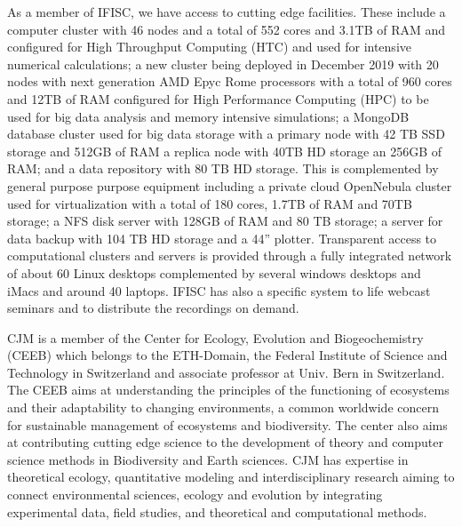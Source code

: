 \documentclass[authoryear,1p,12pt]{elsarticle}
\begin{document}
     As a member of IFISC, we have access to cutting edge
     facilities. These include a computer cluster with 46 nodes and a
     total of 552 cores and 3.1TB of RAM and configured for High
     Throughput Computing (HTC) and used for intensive numerical
     calculations; a new cluster being deployed in December 2019 with
     20 nodes with next generation AMD Epyc Rome processors with a
     total of 960 cores and 12TB of RAM configured for High
     Performance Computing (HPC) to be used for big data analysis and
     memory intensive simulations; a MongoDB database cluster used for
     big data storage with a primary node with 42 TB SSD storage and
     512GB of RAM a replica node with 40TB HD storage an 256GB of RAM;
     and a data repository with 80 TB HD storage. This is complemented
     by general purpose purpose equipment including a private cloud
     OpenNebula cluster used for virtualization with a total of 180
     cores, 1.7TB of RAM and 70TB storage; a NFS disk server with
     128GB of RAM and 80 TB storage; a server for data backup with 104
     TB HD storage and a 44'' plotter. Transparent access to
     computational clusters and servers is provided through a fully
     integrated network of about 60 Linux desktops complemented by
     several windows desktops and iMacs and around 40 laptops. IFISC
     has also a specific system to life webcast seminars and to
     distribute the recordings on demand.

     CJM is a member of the Center for Ecology, Evolution and
     Biogeochemistry (CEEB) which belongs to the ETH-Domain, the
     Federal Institute of Science and Technology in Switzerland and
     associate professor at Univ. Bern in Switzerland. The CEEB aims
     at understanding the principles of the functioning of ecosystems
     and their adaptability to changing environments, a common
     worldwide concern for sustainable management of ecosystems and
     biodiversity. The center also aims at contributing cutting edge
     science to the development of theory and computer science methods
     in Biodiversity and Earth sciences. CJM has expertise in
     theoretical ecology, quantitative modeling and interdisciplinary
     research aiming to connect environmental sciences, ecology and
     evolution by integrating experimental data, field studies, and
     theoretical and computational methods.
\end{document}
